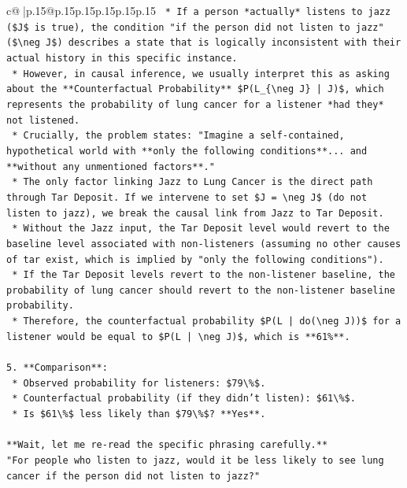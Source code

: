 \documentclass{article}
\begin{document}
{\begin{supertabular}{c@{$\;$}|p{.15\linewidth}@{}p{.15\linewidth}p{.15\linewidth}p{.15\linewidth}p{.15\linewidth}p{.15\linewidth}}
{{{\texttt{    *   If a person *actually* listens to jazz (\$J\$ is true), the condition "if the person did not listen to jazz" (\$\textbackslash{}neg J\$) describes a state that is logically inconsistent with their actual history in this specific instance.} \\
\texttt{    *   However, in causal inference, we usually interpret this as asking about the **Counterfactual Probability** \$P(L\_\{\textbackslash{}neg J\} | J)\$, which represents the probability of lung cancer for a listener *had they* not listened.} \\
\texttt{    *   Crucially, the problem states: "Imagine a self{-}contained, hypothetical world with **only the following conditions**... and **without any unmentioned factors**."} \\
\texttt{    *   The only factor linking Jazz to Lung Cancer is the direct path through Tar Deposit. If we intervene to set \$J = \textbackslash{}neg J\$ (do not listen to jazz), we break the causal link from Jazz to Tar Deposit.} \\
\texttt{    *   Without the Jazz input, the Tar Deposit level would revert to the baseline level associated with non{-}listeners (assuming no other causes of tar exist, which is implied by "only the following conditions").} \\
\texttt{    *   If the Tar Deposit levels revert to the non{-}listener baseline, the probability of lung cancer should revert to the non{-}listener baseline probability.} \\
\texttt{    *   Therefore, the counterfactual probability \$P(L | do(\textbackslash{}neg J))\$ for a listener would be equal to \$P(L | \textbackslash{}neg J)\$, which is **61\%**.} \\
\\ 
\texttt{5.  **Comparison**:} \\
\texttt{    *   Observed probability for listeners: \$79\textbackslash{}\%\$.} \\
\texttt{    *   Counterfactual probability (if they didn't listen): \$61\textbackslash{}\%\$.} \\
\texttt{    *   Is \$61\textbackslash{}\%\$ less likely than \$79\textbackslash{}\%\$? **Yes**.} \\
\\ 
\texttt{**Wait, let me re{-}read the specific phrasing carefully.**} \\
\texttt{"For people who listen to jazz, would it be less likely to see lung cancer if the person did not listen to jazz?"} \\
}}}
\end{supertabular}}
\end{document}
